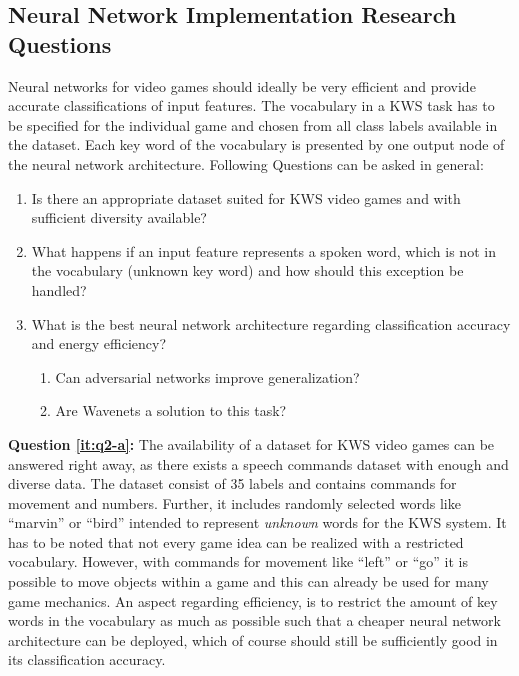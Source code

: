 \subsection{Neural Network Implementation Research Questions}\label{sec:intro_rq_nn}
Neural networks for video games should ideally be very efficient and provide accurate classifications of input features.
The vocabulary in a KWS task has to be specified for the individual game and chosen from all class labels available in the dataset.
Each key word of the vocabulary is presented by one output node of the neural network architecture.
Following Questions can be asked in general:
\begin{enumerate}[label={Q.2.\alph*)}, leftmargin=1.75cm]
  \item Is there an appropriate dataset suited for KWS video games and with sufficient diversity available?\label{it:q2-a}
  \item What happens if an input feature represents a spoken word, which is not in the vocabulary (unknown key word) and how should this exception be handled?\label{it:q2-b}
  \item What is the best neural network architecture regarding classification accuracy and energy efficiency?\label{it:q2-c}
  \begin{enumerate}[label=(\roman*)]
    \item Can adversarial networks improve generalization?
    \item Are Wavenets a solution to this task?
  \end{enumerate}
\end{enumerate}
\noindent
\textbf{Question \ref{it:q2-a}:} 
The availability of a dataset for KWS video games can be answered right away, as there exists a speech commands dataset \cite{Warden2018} with enough and diverse data.
The dataset consist of 35 labels and contains commands for movement and numbers.
Further, it includes randomly selected words like \enquote{marvin} or \enquote{bird} intended to represent \emph{unknown} words for the KWS system.
It has to be noted that not every game idea can be realized with a restricted vocabulary.
However, with commands for movement like \enquote{left} or \enquote{go} it is possible to move objects within a game and this can already be used for many game mechanics.
An aspect regarding efficiency, is to restrict the amount of key words in the vocabulary as much as possible such that a cheaper neural network architecture can be deployed, which of course should still be sufficiently good in its classification accuracy.

